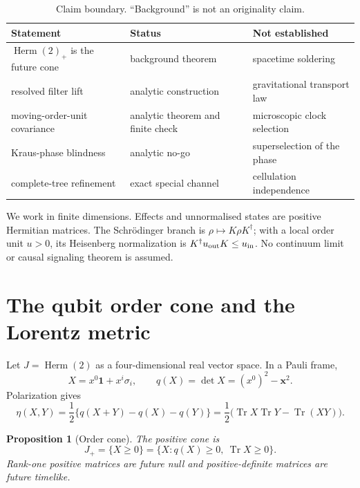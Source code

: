 \documentclass[11pt]{article}
\newtheorem{proposition}[theorem]{Proposition}
\theoremstyle{remark}
\newcommand{\Herm}{\operatorname{Herm}}
\newcommand{\Tr}{\operatorname{Tr}}
\newcommand{\id}{\mathbf 1}
\begin{document}
\begin{table}[ht]
\centering
\begin{tabular}{@{}>{\raggedright\arraybackslash}p{.24\linewidth}>{\raggedright\arraybackslash}p{.34\linewidth}>{\raggedright\arraybackslash}p{.32\linewidth}@{}}
\toprule
Statement & Status & Not established \\
\midrule
$\Herm(2)_+$ is the future cone & background theorem & spacetime soldering \\
resolved filter lift & analytic construction & gravitational transport law \\
moving-order-unit covariance & analytic theorem and finite check & microscopic clock selection \\
Kraus-phase blindness & analytic no-go & superselection of the phase \\
complete-tree refinement & exact special channel & cellulation independence \\
\bottomrule
\end{tabular}
\caption{Claim boundary.  ``Background'' is not an originality claim.}
\label{tab:claims}
\end{table}

We work in finite dimensions.  Effects and unnormalised states are positive Hermitian
matrices.  The Schr\"odinger branch is $\rho\mapsto K\rho K^\dagger$; with a local order
unit $u>0$, its Heisenberg normalization is $K^\dagger u_{\rm out}K\leq u_{\rm in}$.
No continuum limit or causal signaling theorem is assumed.

\section{The qubit order cone and the Lorentz metric}

Let $J=\Herm(2)$ as a four-dimensional real vector space.  In a Pauli frame,
\begin{equation}
 X=x^0\id+x^i\sigma_i,
 \qquad q(X)=\det X=(x^0)^2-\bm x^2 .
 \label{eq:minkowski-determinant}
\end{equation}
Polarization gives
\begin{equation}
 \eta(X,Y)=\frac12\{q(X+Y)-q(X)-q(Y)\}
 =\frac12\bigl(\Tr X\Tr Y-\Tr(XY)\bigr).
 \label{eq:det-polarization}
\end{equation}

\begin{proposition}[Order cone]
\label{prop:order-cone}
The positive cone is
\begin{equation}
 J_+=\{X\geq0\}=\{X:q(X)\geq0,\ \Tr X\geq0\}.
 \label{eq:future-cone}
\end{equation}
Rank-one positive matrices are future null and positive-definite matrices are future
timelike.
\end{proposition}
\end{document}
